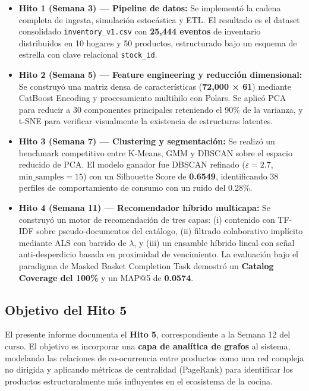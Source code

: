 \documentclass[12pt,a4paper]{article}
\newcommand{\metric}[1]{\textcolor{metricblue}{\textbf{#1}}}
\newcommand{\code}[1]{\texttt{\small #1}}
\begin{document}
\begin{itemize}
    \item \textbf{Hito 1 (Semana 3) — Pipeline de datos:} Se implementó la cadena completa de ingesta, simulación estocástica y ETL. El resultado es el dataset consolidado \code{inventory\_v1.csv} con \metric{25{,}444 eventos} de inventario distribuidos en 10 hogares y 50 productos, estructurado bajo un esquema de estrella con clave relacional \code{stock\_id}.

    \item \textbf{Hito 2 (Semana 5) — Feature engineering y reducción dimensional:} Se construyó una matriz densa de características (\metric{72{,}000 × 61}) mediante CatBoost Encoding y procesamiento multihilo con Polars. Se aplicó PCA para reducir a 30 componentes principales reteniendo el 90\% de la varianza, y t-SNE para verificar visualmente la existencia de estructuras latentes.

    \item \textbf{Hito 3 (Semana 7) — Clustering y segmentación:} Se realizó un benchmark competitivo entre K-Means, GMM y DBSCAN sobre el espacio reducido de PCA. El modelo ganador fue DBSCAN refinado ($\varepsilon = 2.7$, $\text{min\_samples} = 15$) con un Silhouette Score de \metric{0.6549}, identificando 38 perfiles de comportamiento de consumo con un ruido del 0.28\%.

    \item \textbf{Hito 4 (Semana 11) — Recomendador híbrido multicapa:} Se construyó un motor de recomendación de tres capas: (i) contenido con TF-IDF sobre pseudo-documentos del catálogo, (ii) filtrado colaborativo implícito mediante ALS con barrido de $\lambda$, y (iii) un ensamble híbrido lineal con señal anti-desperdicio basada en proximidad de vencimiento. La evaluación bajo el paradigma de Masked Basket Completion Task demostró un \metric{Catalog Coverage del 100\%} y un MAP@5 de \metric{0.0574}.
\end{itemize}

\subsection{Objetivo del Hito 5}

El presente informe documenta el \textbf{Hito 5}, correspondiente a la Semana 12 del curso. El objetivo es incorporar una \textbf{capa de analítica de grafos} al sistema, modelando las relaciones de co-ocurrencia entre productos como una red compleja no dirigida y aplicando métricas de centralidad (PageRank) para identificar los productos estructuralmente más influyentes en el ecosistema de la cocina.
\end{document}
